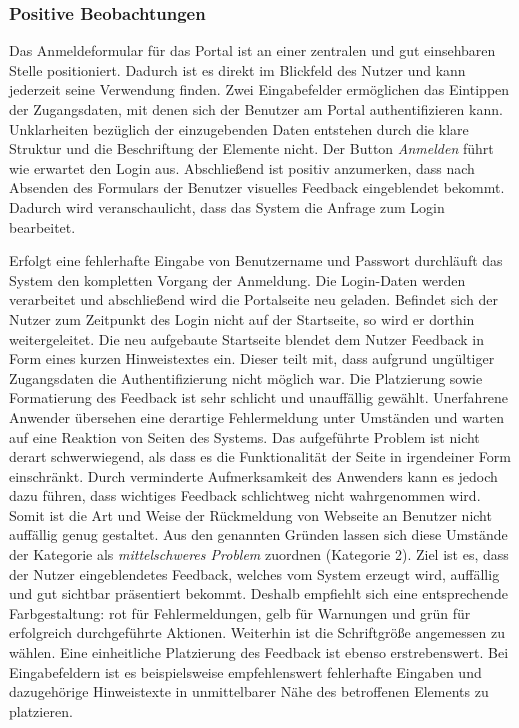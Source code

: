 \newpage
{}

\subsubsection*{Positive Beobachtungen}
Das Anmeldeformular für das Portal ist an einer zentralen und gut einsehbaren Stelle positioniert. Dadurch ist es direkt im Blickfeld des Nutzer und kann jederzeit seine Verwendung finden. Zwei Eingabefelder ermöglichen das Eintippen der Zugangsdaten, mit denen sich der Benutzer am Portal authentifizieren kann. Unklarheiten bezüglich der einzugebenden Daten entstehen durch die klare Struktur und die Beschriftung der Elemente nicht. Der Button \emph{Anmelden} führt wie erwartet den Login aus. Abschließend ist positiv anzumerken, dass nach Absenden des Formulars der Benutzer visuelles Feedback eingeblendet bekommt. Dadurch wird veranschaulicht, dass das System die Anfrage zum Login bearbeitet.

{
	Erfolgt eine fehlerhafte Eingabe von Benutzername und Passwort durch\-läuft das System den kompletten Vorgang der Anmeldung. Die Login-Daten werden verarbeitet und abschließend wird die Portalseite neu geladen. Befindet sich der Nutzer zum Zeitpunkt des Login nicht auf der Startseite, so wird er dorthin weitergeleitet. Die neu aufgebaute Startseite blendet dem Nutzer Feedback in Form eines kurzen Hinweistextes ein. Dieser teilt mit, dass aufgrund ungültiger Zugangsdaten die Authentifizierung nicht möglich war. Die Platzierung sowie Formatierung des Feedback ist sehr schlicht und unauffällig gewählt. Unerfahrene Anwender übersehen eine derartige Fehlermeldung unter Umständen und warten auf eine Reaktion von Seiten des Systems.
}
{
	Das aufgeführte Problem ist nicht derart schwerwiegend, als dass es die Funktionalität der Seite in irgendeiner Form einschränkt. Durch verminderte Aufmerksamkeit des Anwenders kann es jedoch dazu führen, dass wichtiges Feedback schlichtweg nicht wahrgenommen wird. Somit ist die Art und Weise der Rückmeldung von Webseite an Benutzer nicht auffällig genug gestaltet. Aus den genannten Gründen lassen sich diese Umstände der Kategorie als \emph{mittelschweres Problem} zuordnen (Kategorie 2).		
}
{
	Ziel ist es, dass der Nutzer eingeblendetes Feedback, welches vom System erzeugt wird, auffällig und gut sichtbar präsentiert bekommt. Deshalb empfiehlt sich eine entsprechende Farbgestaltung: rot für Fehlermeldungen, gelb für Warnungen und grün für erfolgreich durchgeführte Aktionen. Weiterhin ist die Schriftgröße angemessen zu wählen. Eine einheitliche Platzierung des Feedback ist ebenso erstrebenswert. Bei Eingabefeldern ist es beispielsweise empfehlenswert fehlerhafte Eingaben und dazugehörige Hinweistexte in unmittelbarer Nähe des betroffenen Elements zu platzieren.
}
\label{prob:suche:loginfehler}


